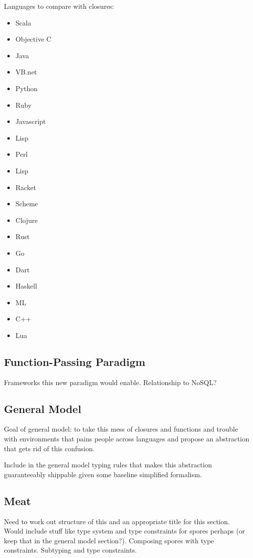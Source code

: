 \documentclass{llncs}
\begin{document}
Languages to compare with closures: 

\begin{itemize}
\item Scala
\item Objective C
\item Java
\item VB.net
\item Python
\item Ruby
\item Javascript
\item Lisp
\item Perl
\item Lisp
\item Racket
\item Scheme
\item Clojure
\item Rust
\item Go
\item Dart
\item Haskell
\item ML
\item C++
\item Lua
\end{itemize}

\subsection{Function-Passing Paradigm}

Frameworks this new paradigm would enable. Relationship to NoSQL?

\subsection{General Model}

Goal of general model: to take this mess of closures and functions and trouble with environments that pains people across languages and propose an abstraction that gets rid of this confusion.

Include in the general model typing rules that makes this abstraction guaranteeably shippable
given some baseline simplified formalism.

\subsection{Meat}

Need to work out structure of this and an appropriate title for this section. Would include stuff like type system and type constraints for spores perhaps (or keep that in the general model section?). Composing spores with type constraints. Subtyping and type constraints.
\end{document}
